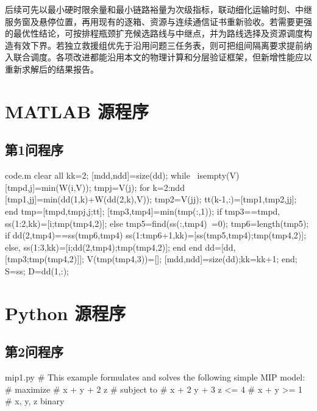 \documentclass[bwprint,fontset=fandol]{gmcmthesis}
\begin{document}
后续可先以最小硬时限余量和最小链路裕量为次级指标，联动细化运输时刻、中继服务窗及悬停位置，再用现有的逐箱、资源与连续通信证书重新验收。若需要更强的最优性结论，可按排程瓶颈扩充候选路线与中继点，并为路线选择及资源调度构造有效下界。若独立救援组优先于沿用问题三任务表，则可把组间隔离要求提前纳入联合调度。各项改进都能沿用本文的物理计算和分层验证框架，但新增性能应以重新求解后的结果报告。

\clearpage
\begin{appendices}
\section{MATLAB 源程序}
\renewcommand{\thesubsection}{A\thinspace.\thinspace\arabic{subsection}}
\subsection{第1问程序}
\vspace{-2ex}

\begin{Matlab}{code.m}
clear all
kk=2;
[mdd,ndd]=size(dd);
while ~isempty(V)
    [tmpd,j]=min(W(i,V));
    tmpj=V(j);
    for k=2:ndd
        [tmp1,jj]=min(dd(1,k)+W(dd(2,k),V));
        tmp2=V(jj);
        tt(k-1,:)=[tmp1,tmp2,jj];
    end
    tmp=[tmpd,tmpj,j;tt];
    [tmp3,tmp4]=min(tmp(:,1));
    if tmp3==tmpd,
        ss(1:2,kk)=[i;tmp(tmp4,2)];
    else
        tmp5=find(ss(:,tmp4)~=0);
        tmp6=length(tmp5);
        if dd(2,tmp4)==ss(tmp6,tmp4)
            ss(1:tmp6+1,kk)=[ss(tmp5,tmp4);tmp(tmp4,2)];
        else, ss(1:3,kk)=[i;dd(2,tmp4);tmp(tmp4,2)];
        end
    end
    dd=[dd,[tmp3;tmp(tmp4,2)]];
    V(tmp(tmp4,3))=[];
    [mdd,ndd]=size(dd);kk=kk+1;
end;
S=ss; D=dd(1,:);
\end{Matlab}
\vspace{2ex}

\clearpage
\section{Python 源程序}
\renewcommand{\thesubsection}{B\thinspace.\thinspace\arabic{subsection}}
\subsection{第2问程序}
\vspace{-2ex}
\begin{Python}{mip1.py}
# This example formulates and solves the following simple MIP model:
#  maximize
#        x +   y + 2 z
#  subject to
#        x + 2 y + 3 z <= 4
#        x +   y       >= 1
#        x, y, z binary


\end{Python}
\end{appendices}
\end{document}

